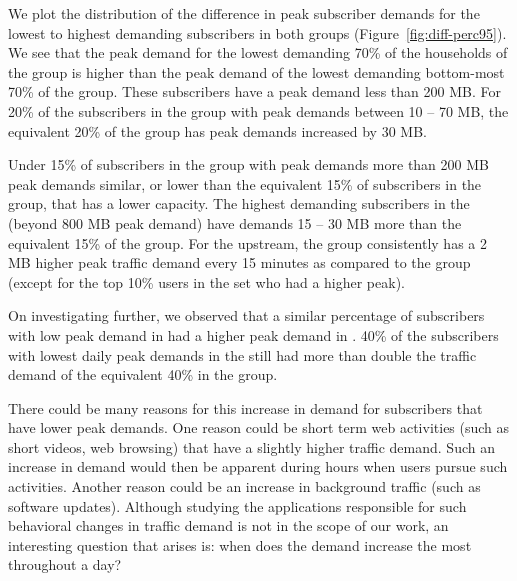 We plot the distribution of the difference in peak subscriber demands for
the lowest to highest demanding subscribers in both groups (Figure~\ref{fig:diff-perc95}).
We see that the peak demand for the lowest demanding 70\% of the households of
the \treatment{} group is higher than the peak demand of the lowest demanding bottom-most
70\% of the \control{} group. These subscribers have a peak demand less than 200 MB.
For 20\% of the subscribers in the \control{} group with peak demands between 10 -- 70 MB,
the equivalent 20\% of the \treatment{} group has peak demands increased by 30 MB.

Under 15\% of subscribers in the \treatment{} group with peak demands more than 200 MB 
peak demands similar, or lower than the equivalent 15\% of subscribers in the \control{}
group, that has a lower capacity. The highest demanding subscribers in the \treatment{}
(beyond 800 MB peak demand) have demands 15 -- 30 MB more than the equivalent 15\% of 
the \control{} group. For the upstream, the \treatment{} group consistently has
a 2 MB higher peak traffic demand every 15 minutes as compared to the \control{} group
(except for the top 10\% users in the \treatment{} set who had a higher peak).


On investigating further, we observed that a similar percentage of 
subscribers with low peak demand in \control{} had a higher peak demand in \treatment{}.
40\% of the subscribers with lowest daily peak demands in the \treatment{} still
had more than double the traffic demand of the equivalent 40\% in the \control{} group.

There could be many reasons for this increase in demand for subscribers that
have lower peak demands. One reason could be short term web activities (such as short videos,
web browsing) that have a slightly higher traffic demand. Such an increase in demand would then
be apparent during hours when users pursue such activities. Another reason could be
an increase in background traffic (such as software updates). Although studying the applications 
responsible for such behavioral changes in traffic demand is not in the scope of our
work, an interesting question that arises is: when does the demand increase the most 
throughout a day?